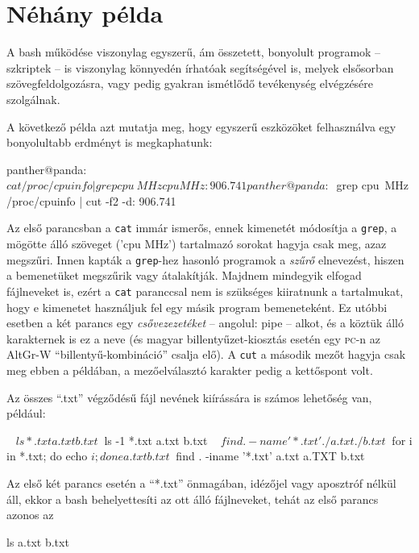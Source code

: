 \section{Néhány példa}

A bash működése viszonylag egyszerű, ám összetett, bonyolult programok --
szkriptek -- is viszonylag könnyedén írhatóak segítségével is, melyek elsősorban
szövegfeldolgozásra, vagy pedig gyakran ismétlődő tevékenység elvégzésére
szolgálnak.

A következő példa azt mutatja meg, hogy egyszerű eszközöket felhasználva egy
bonyolultabb erdményt is megkaphatunk:

\begin{VerbExampleNum}
panther@panda:~$ cat /proc/cpuinfo | grep cpu\ MHz
cpu MHz         : 906.741
panther@panda:~$ grep cpu\ MHz /proc/cpuinfo | cut -f2 -d:
 906.741
\end{VerbExampleNum}

Az első parancsban a \texttt{cat} immár ismerős, ennek kimenetét módosítja a
\texttt{grep}, a mögötte álló szöveget ('cpu MHz') tartalmazó sorokat hagyja
csak meg, azaz megszűri. Innen kapták a \texttt{grep}-hez hasonló programok a
\emph{szűrő} elnevezést, hiszen a bemenetüket megszűrik vagy
átalakítják. Majdnem mindegyik elfogad fájlneveket is, ezért a \texttt{cat}
paranccsal nem is szükséges kiiratnunk a tartalmukat, hogy e kimenetet
használjuk fel egy másik program bemeneteként. Ez utóbbi esetben a két parancs
egy \emph{csővezezetéket} -- angolul: pipe -- alkot, és a köztük álló
karakternek is ez a neve (és magyar billentyűzet-kiosztás esetén egy
\textsc{pc}-n az AltGr-W ``billentyű-kombináció'' csalja elő). A \texttt{cut} a
második mezőt hagyja csak meg ebben a példában, a mezőelválasztó karakter pedig
a kettőspont volt.

Az összes ``.txt'' végződésű fájl nevének kiírássára is számos lehetőség van,
például:

\begin{VerbExampleNum}
~ $ ls *.txt
a.txt b.txt
~ $ ls -1 *.txt
a.txt
b.txt
~ $ find . -name '*.txt'
./a.txt
./b.txt
~ $ for i in *.txt; do echo $i; done
a.txt
b.txt
~ $ find . -iname '*.txt'
a.txt
a.TXT
b.txt
\end{VerbExampleNum}

Az első két parancs esetén a ``*.txt'' önmagában, idézőjel vagy aposztróf nélkül
áll, ekkor a bash behelyettesíti az ott álló fájlneveket, tehát az első parancs
azonos az

\begin{VerbExample}
ls a.txt b.txt
\end{VerbExample}

